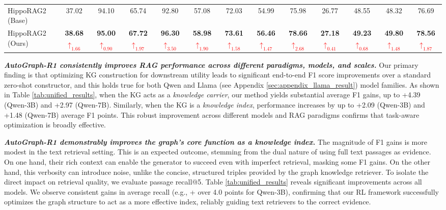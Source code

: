 \documentclass[11pt]{article}
\begin{document}
\begin{table}[!ht]
{\begin{NiceTabular}{@{}l|cc|cc|cc|cc|cc|cc@{}}
HippoRAG2 (Base)  & 37.02 & 94.10 & 65.74 & 92.80 & 57.08 & 72.03 & 54.99 & 75.98 & 26.77 & 48.55 & 48.32 & 76.69 \\
HippoRAG2 (Ours)  & \textbf{38.68}\textcolor{red}{$\uparrow_{1.66}$} & \textbf{95.00}\textcolor{red}{$\uparrow_{0.90}$} & \textbf{67.72}\textcolor{red}{$\uparrow_{1.97}$} & \textbf{96.30}\textcolor{red}{$\uparrow_{3.50}$} & \textbf{58.98}\textcolor{red}{$\uparrow_{1.90}$} & \textbf{73.61}\textcolor{red}{$\uparrow_{1.58}$} & \textbf{56.46}\textcolor{red}{$\uparrow_{1.47}$} & \textbf{78.66}\textcolor{red}{$\uparrow_{2.68}$} & \textbf{27.18}\textcolor{red}{$\uparrow_{0.41}$} & \textbf{49.23}\textcolor{red}{$\uparrow_{0.68}$} & \textbf{49.80}\textcolor{red}{$\uparrow_{1.48}$} & \textbf{78.56}\textcolor{red}{$\uparrow_{1.87}$} \\
\bottomrule
\end{NiceTabular}}
\end{table}


\textbf{\textit{AutoGraph-R1 consistently improves RAG performance across different paradigms, models, and scales.}} Our primary finding is that optimizing KG construction for downstream utility leads to significant end-to-end F1 score improvements over a standard zero-shot constructor, and this holds true for both Qwen and Llama (see Appendix \ref{sec:appendix_llama_result}) model families. As shown in Table \ref{tab:unified_results}, when the KG acts as a \textit{knowledge carrier}, our method yields substantial average F1 gains, up to +4.39 (Qwen-3B) and +2.97 (Qwen-7B). Similarly, when the KG is a \textit{knowledge index}, performance increases by up to +2.09 (Qwen-3B) and +1.48 (Qwen-7B) average F1 points. This robust improvement across different models and RAG paradigms confirms that task-aware optimization is broadly effective.


\textbf{\textit{AutoGraph-R1 demonstrably improves the graph's core function as a knowledge index.}} The magnitude of F1 gains is more modest in the text retrieval setting. This is an expected outcome, stemming from the dual nature of using full text passages as evidence. On one hand, their rich context can enable the generator to succeed even with imperfect retrieval, masking some F1 gains. On the other hand, this verbosity can introduce noise, unlike the concise, structured triples provided by the graph knowledge retriever. To isolate the direct impact on retrieval quality, we evaluate passage recall@5. Table \ref{tab:unified_results} reveals significant improvements across all models. We observe consistent gains in average recall (e.g., + over 4.0 points for Qwen-3B), confirming that our RL framework successfully optimizes the graph structure to act as a more effective index, reliably guiding text retrievers to the correct evidence.
\end{document}
